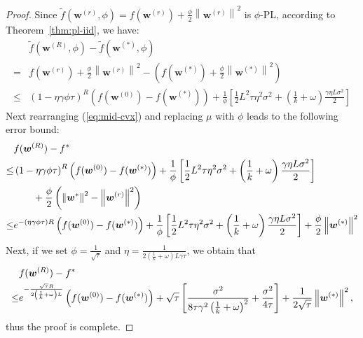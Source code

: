 \documentclass[sigconf, anonymous, review]{acmart}
\begin{document}
\begin{proof}
Since $\tilde{f}(\boldsymbol{w}^{(r)},\phi)=f(\boldsymbol{w}^{(r)})+\frac{\phi}{2}\left\|\boldsymbol{w}^{(r)}\right\|^2$ is $\phi$-PL, according to Theorem~\ref{thm:pl-iid}, we have:
\begin{align}
   & \tilde{f}(\boldsymbol{w}^{(R)},\phi)-\tilde{f}(\boldsymbol{w}^{(*)},\phi)\nonumber\\
   =&{f}(\boldsymbol{w}^{(r)})+\frac{\phi}{2}\left\|\boldsymbol{w}^{(r)}\right\|^2-\left({f}(\boldsymbol{w}^{(*)})+\frac{\phi}{2}\left\|\boldsymbol{w}^{(*)}\right\|^2\right)\nonumber\\
    \leq& \left(1-\eta\gamma{\phi\tau}\right)^R\left(f(\boldsymbol{w}^{(0)})-f(\boldsymbol{w}^{(*)})\right)+\frac{1}{{\phi}}\left[\frac{1}{2} L^2\tau\eta^2\sigma^2+\left(\frac{1}{k}+\omega\right)\frac{\gamma\eta L\sigma^2}{2}\right]\label{eq:mid-cvx}
\end{align}
Next rearranging (\ref{eq:mid-cvx}) and replacing $\mu$ with $\phi$ leads to the following error bound:
\begin{align}\notag
  &  {f}(\boldsymbol{w}^{(R)})-f^*\\\notag
  \leq& \left(1-\eta\gamma{\phi\tau}\right)^R\left(f(\boldsymbol{w}^{(0)})-f(\boldsymbol{w}^{(*)})\right)+\frac{1}{{\phi}}\left[\frac{1}{2} L^2\tau\eta^2\sigma^2+\left(\frac{1}{k}+\omega\right)\frac{\gamma\eta L\sigma^2}{2}\right]\\\notag
  &\qquad +\frac{\phi}{2}\left(\left\|\boldsymbol{w}^*\right\|^2-\left\|\boldsymbol{w}^{(r)}\right\|^2\right)\\\notag
    \leq& e^{-\left(\eta\gamma{\phi\tau}\right)R}\left(f(\boldsymbol{w}^{(0)})-f(\boldsymbol{w}^{(*)})\right)+\frac{1}{{\phi}}\left[\frac{1}{2} L^2\tau\eta^2\sigma^2+\left(\frac{1}{k}+\omega\right)\frac{\gamma\eta L\sigma^2}{2}\right] +\frac{\phi}{2}\left\|\boldsymbol{w}^{(*)}\right\|^2 
\end{align}
Next, if we set $\phi=\frac{1}{\sqrt{\tau}}$ and $\eta=\frac{1}{2\left(\frac{1}{k}+{\omega}\right)L\gamma \tau}$, we obtain that
\begin{align}\notag
        &{f}(\boldsymbol{w}^{(R)})-f^*\\\notag
        \leq& e^{-\frac{\sqrt{\tau}R}{2\left(\frac{1}{k}+\omega\right)L }}\left(f(\boldsymbol{w}^{(0)})-f(\boldsymbol{w}^{(*)})\right)+\sqrt{\tau}\left[\frac{\sigma^2}{8\tau\gamma^2\left(\frac{1}{k}+\omega\right)^2} +\frac{\sigma^2}{4\tau }\right] +\frac{1}{2\sqrt{\tau}}\left\|\boldsymbol{w}^{(*)}\right\|^2 ,
\end{align}
thus the proof is complete. 
\end{proof}
\end{document}
